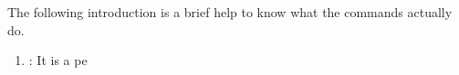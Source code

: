 \documentclass[11pt]{article}
\begin{document}
The following introduction is a brief help to know what the commands actually do.
\begin{enumerate}
\item {}: It is a pe
\end{enumerate}
\end{document}

